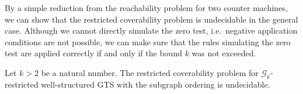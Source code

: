 \documentclass{llncs}
\begin{document}

By a simple reduction from the reachability problem for two counter machines, 
we can show that the restricted coverability problem is undecidable in the 
general case. Although we cannot directly simulate the zero test, i.e.~negative 
application conditions are not possible, we can make sure that the rules 
simulating the zero test are applied correctly if and only if the bound $k$ was 
not exceeded.

\newcommand{\propSubgraphUndecidable}{Let $k > 2$ be a natural number. The 
restricted coverability problem for $\mathcal{G}_k$-restricted well-structured 
GTS with the subgraph ordering is undecidable.}
\begin{proposition}\label{prop:subgraph-is-undecidable}
\propSubgraphUndecidable
\end{proposition}
\end{document}
